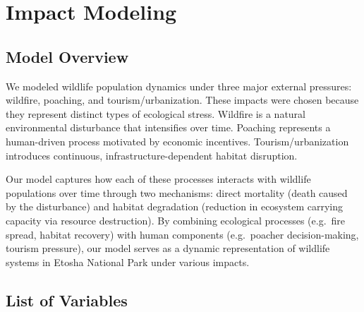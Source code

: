 \section{Impact Modeling}

\subsection{Model Overview}

We modeled wildlife population dynamics under three major external pressures: wildfire, poaching, and tourism/urbanization. These impacts were chosen because they represent distinct types of ecological stress. Wildfire is a natural environmental disturbance that intensifies over time. Poaching represents a human-driven process motivated by economic incentives. Tourism/urbanization introduces continuous, infrastructure-dependent habitat disruption.

Our model captures how each of these processes interacts with wildlife populations over time through two mechanisms: direct mortality (death caused by the disturbance) and habitat degradation (reduction in ecosystem carrying capacity via resource destruction). By combining ecological processes (e.g.\ fire spread, habitat recovery) with human components (e.g.\ poacher decision-making, tourism pressure), our model serves as a dynamic representation of wildlife systems in Etosha National Park under various impacts.

\subsection{List of Variables}

